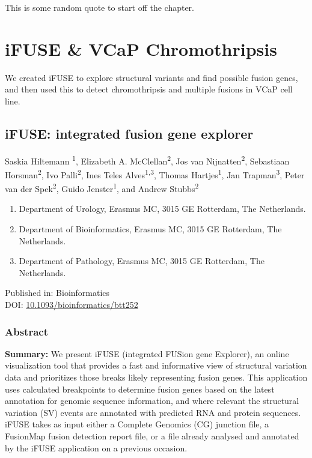 \begin{savequote}[75mm]
This is some random quote to start off the chapter.
\end{savequote}

\chapter{iFUSE \& VCaP Chromothripsis}
\setcounter{figure}{-1}
\setcounter{table}{-1}
\setcounter{section}{-1}

We created iFUSE to explore structural variants and find possible fusion genes, and then used this to detect chromothripsis and multiple fusions in VCaP cell line.

%
\newpage
\section*{iFUSE: integrated fusion gene explorer}
Saskia Hiltemann \textsuperscript{1}, Elizabeth A. McClellan\textsuperscript{2}, Jos van Nijnatten\textsuperscript{2}, Sebastiaan Horsman\textsuperscript{2}, Ivo Palli\textsuperscript{2}, Ines Teles Alves\textsuperscript{1,3}, Thomas Hartjes\textsuperscript{1}, Jan Trapman\textsuperscript{3}, Peter van der Spek\textsuperscript{2}, Guido Jenster\textsuperscript{1}, and Andrew Stubbs\textsuperscript{2}

\small
\begin{enumerate}
\itemsep-0.5em
\item Department of Urology, Erasmus MC, 3015 GE Rotterdam, The Netherlands.
\item Department of Bioinformatics, Erasmus MC, 3015 GE Rotterdam, The Netherlands.
\item Department of Pathology, Erasmus MC, 3015 GE Rotterdam, The Netherlands.
\end{enumerate}

Published in: Bioinformatics \\
DOI: \url{10.1093/bioinformatics/btt252} \\

\subsection*{Abstract}

\textbf{Summary:} We present iFUSE (integrated FUSion gene Explorer), an online visualization tool that provides a fast and informative view of structural variation data and prioritizes those breaks likely representing fusion genes. \color{black} This application uses calculated breakpoints to determine fusion genes based on the latest annotation for genomic sequence information, and where relevant the structural variation (SV) events are annotated with predicted RNA and protein sequences. iFUSE takes as input either a Complete Genomics (CG) junction file, a FusionMap \cite{fusionmap} fusion detection report file, or a file already analysed and annotated by the iFUSE application on a previous occasion.

